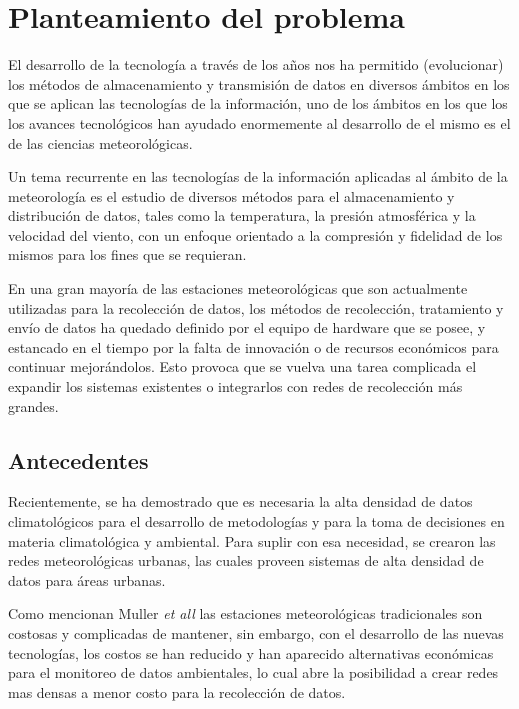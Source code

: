 \section{Planteamiento del problema}

El desarrollo de la tecnología a través de los años nos ha permitido (evolucionar) los métodos de almacenamiento y transmisión de datos en diversos ámbitos en los que se aplican las tecnologías de la información, uno de los ámbitos en los que los los avances tecnológicos han ayudado enormemente al desarrollo de el mismo es el de las ciencias meteorológicas.

Un tema recurrente en las tecnologías de la información aplicadas al ámbito de la meteorología es el estudio de diversos métodos para el almacenamiento y distribución de datos, tales como la temperatura, la presión atmosférica y la velocidad del viento, con un enfoque orientado a la compresión y fidelidad de los mismos para los fines que se requieran.

En una gran mayoría de las estaciones meteorológicas que son actualmente utilizadas para la recolección de datos, los métodos de recolección, tratamiento y envío de datos ha quedado definido por el equipo de hardware que se posee, y estancado en el tiempo por la falta de innovación o de recursos económicos para continuar mejorándolos. Esto provoca que se vuelva una tarea complicada el expandir los sistemas existentes o integrarlos con redes de recolección más grandes.


\subsection{Antecedentes}

Recientemente, se ha demostrado que es necesaria la alta densidad de datos climatológicos \cite{warren2016birmingham} para el desarrollo de metodologías y para la toma de decisiones en materia climatológica y ambiental. Para suplir con esa necesidad, se crearon las redes meteorológicas urbanas, las cuales proveen sistemas de alta densidad de datos para áreas urbanas.

Como mencionan Muller \textit{et all} \cite{doi:10.1002/joc.3678} las estaciones meteorológicas tradicionales son costosas y complicadas de mantener, sin embargo, con el desarrollo de las nuevas tecnologías, los costos se han reducido y han aparecido alternativas económicas \cite{hernandezimplementacion} para el monitoreo de datos ambientales, lo cual abre la posibilidad a crear redes mas densas a menor costo para la recolección de datos.

